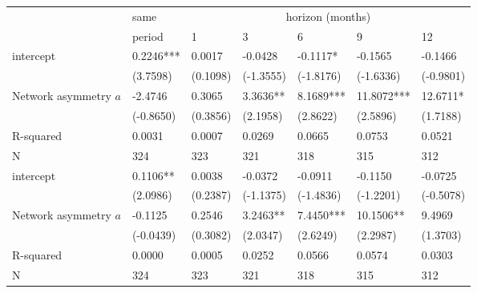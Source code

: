 \begin{tabular}{lllllll}
\toprule
{} &       same & \multicolumn{5}{c}{horizon (months)} \\
{} &     period &                1 &          3 &          6 &           9 &         12 \\
\midrule
intercept             &  0.2246*** &           0.0017 &    -0.0428 &   -0.1117* &     -0.1565 &    -0.1466 \\
                      &   (3.7598) &         (0.1098) &  (-1.3555) &  (-1.8176) &   (-1.6336) &  (-0.9801) \\
Network asymmetry $a$ &    -2.4746 &           0.3065 &   3.3636** &  8.1689*** &  11.8072*** &   12.6711* \\
                      &  (-0.8650) &         (0.3856) &   (2.1958) &   (2.8622) &    (2.5896) &   (1.7188) \\
R-squared             &     0.0031 &           0.0007 &     0.0269 &     0.0665 &      0.0753 &     0.0521 \\
N                     &        324 &              323 &        321 &        318 &         315 &        312 \\
intercept             &   0.1106** &           0.0038 &    -0.0372 &    -0.0911 &     -0.1150 &    -0.0725 \\
                      &   (2.0986) &         (0.2387) &  (-1.1375) &  (-1.4836) &   (-1.2201) &  (-0.5078) \\
Network asymmetry $a$ &    -0.1125 &           0.2546 &   3.2463** &  7.4450*** &   10.1506** &     9.4969 \\
                      &  (-0.0439) &         (0.3082) &   (2.0347) &   (2.6249) &    (2.2987) &   (1.3703) \\
R-squared             &     0.0000 &           0.0005 &     0.0252 &     0.0566 &      0.0574 &     0.0303 \\
N                     &        324 &              323 &        321 &        318 &         315 &        312 \\
\bottomrule
\end{tabular}
